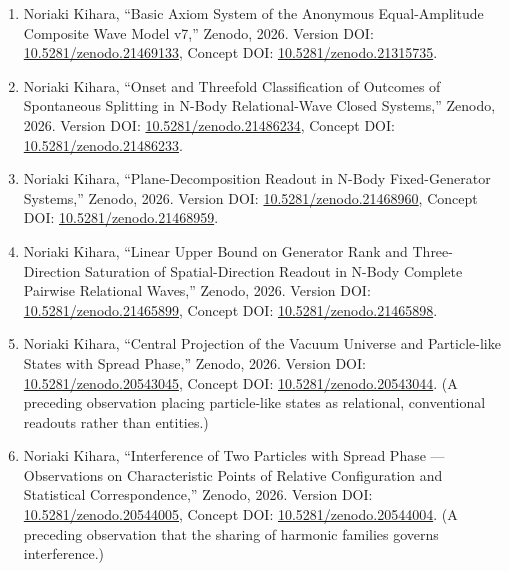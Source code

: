 \documentclass[
  a4paper,
]{article}
\providecommand{\tightlist}{%
  \setlength{\itemsep}{0pt}\setlength{\parskip}{0pt}}
\begin{document}
\begin{enumerate}
\def\labelenumi{\arabic{enumi}.}
\tightlist
\item
  Noriaki Kihara, ``Basic Axiom System of the Anonymous Equal-Amplitude
  Composite Wave Model v7,'' Zenodo, 2026. Version DOI:
  \href{https://doi.org/10.5281/zenodo.21469133}{10.5281/zenodo.21469133},
  Concept DOI:
  \href{https://doi.org/10.5281/zenodo.21315735}{10.5281/zenodo.21315735}.
\item
  Noriaki Kihara, ``Onset and Threefold Classification of Outcomes of
  Spontaneous Splitting in N-Body Relational-Wave Closed Systems,''
  Zenodo, 2026. Version DOI:
  \href{https://doi.org/10.5281/zenodo.21486234}{10.5281/zenodo.21486234},
  Concept DOI:
  \href{https://doi.org/10.5281/zenodo.21486233}{10.5281/zenodo.21486233}.
\item
  Noriaki Kihara, ``Plane-Decomposition Readout in N-Body
  Fixed-Generator Systems,'' Zenodo, 2026. Version DOI:
  \href{https://doi.org/10.5281/zenodo.21468960}{10.5281/zenodo.21468960},
  Concept DOI:
  \href{https://doi.org/10.5281/zenodo.21468959}{10.5281/zenodo.21468959}.
\item
  Noriaki Kihara, ``Linear Upper Bound on Generator Rank and
  Three-Direction Saturation of Spatial-Direction Readout in N-Body
  Complete Pairwise Relational Waves,'' Zenodo, 2026. Version DOI:
  \href{https://doi.org/10.5281/zenodo.21465899}{10.5281/zenodo.21465899},
  Concept DOI:
  \href{https://doi.org/10.5281/zenodo.21465898}{10.5281/zenodo.21465898}.
\item
  Noriaki Kihara, ``Central Projection of the Vacuum Universe and
  Particle-like States with Spread Phase,'' Zenodo, 2026. Version DOI:
  \href{https://doi.org/10.5281/zenodo.20543045}{10.5281/zenodo.20543045},
  Concept DOI:
  \href{https://doi.org/10.5281/zenodo.20543044}{10.5281/zenodo.20543044}.
  (A preceding observation placing particle-like states as relational,
  conventional readouts rather than entities.)
\item
  Noriaki Kihara, ``Interference of Two Particles with Spread Phase ---
  Observations on Characteristic Points of Relative Configuration and
  Statistical Correspondence,'' Zenodo, 2026. Version DOI:
  \href{https://doi.org/10.5281/zenodo.20544005}{10.5281/zenodo.20544005},
  Concept DOI:
  \href{https://doi.org/10.5281/zenodo.20544004}{10.5281/zenodo.20544004}.
  (A preceding observation that the sharing of harmonic families governs
  interference.)
\end{enumerate}
\end{document}
